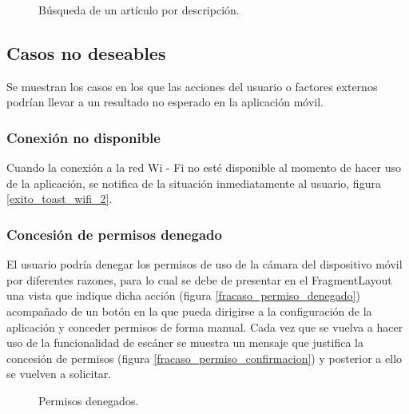 \begin{itemize}
		\begin{figure}[!h]
			\centering
			\caption{Búsqueda de un artículo por descripción.}
			\label{exito_busqueda_desc}
		\end{figure}
\end{itemize}

\subsection{Casos no deseables}
Se muestran los casos en los que las acciones del usuario o factores externos podrían llevar a un resultado no esperado en la aplicación móvil.

\subsubsection{Conexión no disponible}
Cuando la conexión a la red Wi - Fi no esté disponible al momento de hacer uso de la aplicación, se notifica de la situación inmediatamente al usuario, figura \ref{exito_toast_wifi_2}.

\subsubsection{Concesión de permisos denegado}
El usuario podría denegar los permisos de uso de la cámara del dispositivo móvil por diferentes razones, para lo cual se debe de presentar en el FragmentLayout una vista que indique dicha acción (figura \ref{fracaso_permiso_denegado}) acompañado de un botón en la que pueda dirigirse a la configuración de la aplicación y conceder permisos de forma manual.
Cada vez que se vuelva a hacer uso de la funcionalidad de escáner se muestra un mensaje que justifica la concesión de permisos (figura \ref{fracaso_permiso_confirmacion}) y posterior a ello se vuelven a solicitar.

\begin{figure}[!h]
	\centering
	\caption{Permisos denegados.}
	\label{fracaso_permiso}
\end{figure}

